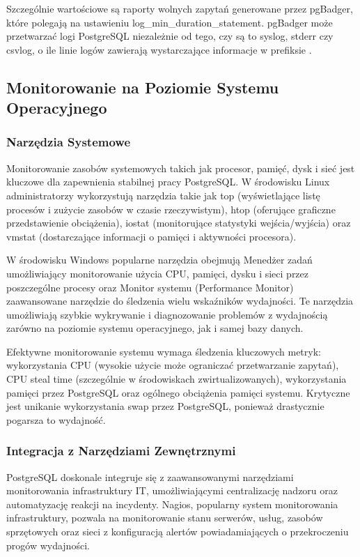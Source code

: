 \documentclass[a4paper,11pt,openany,english]{sphinxmanual}
\begin{document}
\sphinxAtStartPar
Szczególnie wartościowe są raporty wolnych zapytań generowane przez pgBadger, które polegają na ustawieniu log\_min\_duration\_statement. pgBadger może przetwarzać logi PostgreSQL niezależnie od tego, czy są to syslog, stderr czy csvlog, o ile linie logów zawierają wystarczające informacje w prefiksie .


\subsection{Monitorowanie na Poziomie Systemu Operacyjnego}
\label{\detokenize{rozdzial2/Monitorowanie-i-diagnostyka/index:monitorowanie-na-poziomie-systemu-operacyjnego}}

\subsubsection{Narzędzia Systemowe}
\label{\detokenize{rozdzial2/Monitorowanie-i-diagnostyka/index:narzedzia-systemowe}}
\sphinxAtStartPar
Monitorowanie zasobów systemowych takich jak procesor, pamięć, dysk i sieć jest kluczowe dla zapewnienia stabilnej pracy PostgreSQL. W środowisku Linux administratorzy wykorzystują narzędzia takie jak top (wyświetlające listę procesów i zużycie zasobów w czasie rzeczywistym), htop (oferujące graficzne przedstawienie obciążenia), iostat (monitorujące statystyki wejścia/wyjścia) oraz vmstat (dostarczające informacji o pamięci i aktywności procesora).

\sphinxAtStartPar
W środowisku Windows popularne narzędzia obejmują Menedżer zadań umożliwiający monitorowanie użycia CPU, pamięci, dysku i sieci przez poszczególne procesy oraz Monitor systemu (Performance Monitor) \sphinxhyphen{} zaawansowane narzędzie do śledzenia wielu wskaźników wydajności. Te narzędzia umożliwiają szybkie wykrywanie i diagnozowanie problemów z wydajnością zarówno na poziomie systemu operacyjnego, jak i samej bazy danych.

\sphinxAtStartPar
Efektywne monitorowanie systemu wymaga śledzenia kluczowych metryk: wykorzystania CPU (wysokie użycie może ograniczać przetwarzanie zapytań), CPU steal time (szczególnie w środowiskach zwirtualizowanych), wykorzystania pamięci przez PostgreSQL oraz ogólnego obciążenia pamięci systemu. Krytyczne jest unikanie wykorzystania swap przez PostgreSQL, ponieważ drastycznie pogarsza to wydajność.


\subsubsection{Integracja z Narzędziami Zewnętrznymi}
\label{\detokenize{rozdzial2/Monitorowanie-i-diagnostyka/index:integracja-z-narzedziami-zewnetrznymi}}
\sphinxAtStartPar
PostgreSQL doskonale integruje się z zaawansowanymi narzędziami monitorowania infrastruktury IT, umożliwiającymi centralizację nadzoru oraz automatyzację reakcji na incydenty. Nagios, popularny system monitorowania infrastruktury, pozwala na monitorowanie stanu serwerów, usług, zasobów sprzętowych oraz sieci z konfiguracją alertów powiadamiających o przekroczeniu progów wydajności.
\end{document}
